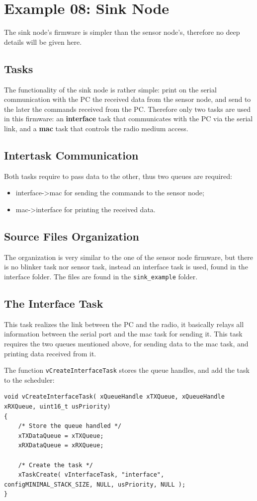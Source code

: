 \documentclass[11pt]{report}
\begin{document}
\section{Example 08: Sink Node}
The sink node's firmware is simpler than the sensor node's, therefore no deep details will be given here.

\subsection{Tasks}
The functionality of the sink node is rather simple: print on the serial communication with the PC the received data from the sensor node, and send to the later the commands received from the PC.
Therefore only two tasks are used in this firmware: an \textbf{interface} task that communicates with the PC via the serial link, and a \textbf{mac} task that controls the radio medium access.

\subsection{Intertask Communication}
Both tasks require to pass data to the other, thus two queues are required:
\begin{itemize}
	\item interface-\textgreater mac for sending the commands to the sensor node;
	\item mac-\textgreater interface for printing the received data.
\end{itemize}

\subsection{Source Files Organization}
The organization is very similar to the one of the sensor node firmware, but there is no blinker task nor sensor task, instead an interface task is used, found in the interface folder. The files are found in the \verb$sink_example$ folder.

\subsection{The Interface Task}
This task realizes the link between the PC and the radio, it basically relays all information between the serial port and the mac task for sending it.
This task requires the two queues mentioned above, for sending data to the mac task, and printing data received from it.

The function \verb$vCreateInterfaceTask$ stores the queue handles, and add the task to the scheduler:
\begin{verbatim}
void vCreateInterfaceTask( xQueueHandle xTXQueue, xQueueHandle xRXQueue, uint16_t usPriority)
{
    /* Store the queue handled */
    xTXDataQueue = xTXQueue;
    xRXDataQueue = xRXQueue;

    /* Create the task */
    xTaskCreate( vInterfaceTask, "interface", configMINIMAL_STACK_SIZE, NULL, usPriority, NULL );
}
\end{verbatim}
\end{document}

